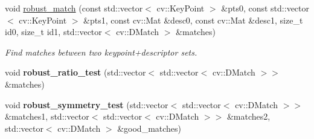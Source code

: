 \begin{DoxyCompactItemize}
void \hyperlink{classov__core_1_1TrackDescriptor_a328a65890fabf3ba88968acf46561d97}{robust\+\_\+match} (const std\+::vector$<$ cv\+::\+Key\+Point $>$ \&pts0, const std\+::vector$<$ cv\+::\+Key\+Point $>$ \&pts1, const cv\+::\+Mat \&desc0, const cv\+::\+Mat \&desc1, size\+\_\+t id0, size\+\_\+t id1, std\+::vector$<$ cv\+::\+D\+Match $>$ \&matches)
\begin{DoxyCompactList}\small\item\em Find matches between two keypoint+descriptor sets. \end{DoxyCompactList}\item 
\mbox{\label{classov__core_1_1TrackDescriptor_ab738252a3242961ff4c496247eff2e10}} 
void {\bfseries robust\+\_\+ratio\+\_\+test} (std\+::vector$<$ std\+::vector$<$ cv\+::\+D\+Match $>$$>$ \&matches)
\item 
\mbox{\label{classov__core_1_1TrackDescriptor_afae4718169c5f4c4fd11a63d6d27d2a4}} 
void {\bfseries robust\+\_\+symmetry\+\_\+test} (std\+::vector$<$ std\+::vector$<$ cv\+::\+D\+Match $>$$>$ \&matches1, std\+::vector$<$ std\+::vector$<$ cv\+::\+D\+Match $>$$>$ \&matches2, std\+::vector$<$ cv\+::\+D\+Match $>$ \&good\+\_\+matches)
\end{DoxyCompactItemize}
